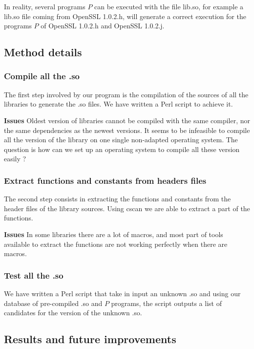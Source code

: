 \documentclass{article}
\begin{document}
    In reality, several programs $P$ can be executed with the file lib.so, for
    example a lib.so file coming from OpenSSL 1.0.2.h, will generate a correct
    execution for the programs $P$ of OpenSSL 1.0.2.h and OpenSSL 1.0.2.j.
		
    \subsection{Method details}
	\subsubsection{Compile all the .so}
	
    The first step involved by our program is the compilation of the sources
    of all the libraries to generate the .so files. We have written a Perl
    script to achieve it.
	
    \textbf{Issues} Oldest version of libraries cannot be compiled with the
    same compiler, nor the same dependencies as the newest versions. It seems
    to be infeasible to compile all the version of the library on one single
    non-adapted operating system. The question is how can we set up an
    operating system to compile all these version easily ?
	
   
   	\subsubsection{Extract functions and constants from headers files}
   	
    The second step consists in extracting the functions and constants from
    the header files of the library sources. Using cscan we are able to
    extract a part of the functions.
   	
    \textbf{Issues} In some libraries there are a lot of macros, and most part
    of tools available to extract the functions are not working perfectly when
    there are macros.   		
   	
   	
   	\subsubsection{Test all the .so}
   		
    We have written a Perl script that take in input an unknown .so and using
    our database of pre-compiled .so and $P$ programs, the script outputs a
    list of candidates for the version of the unknown .so.

   	
   	\subsection{Results and future improvements}
   	
\end{document}
